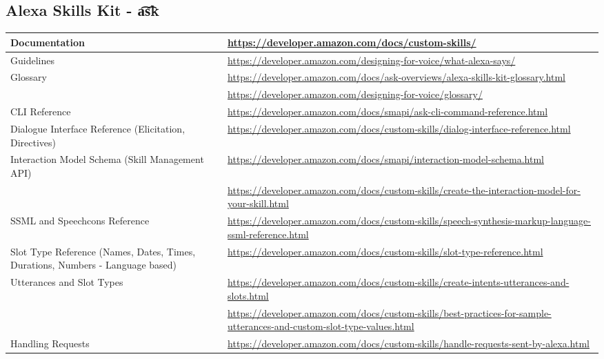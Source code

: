 \subsection*{Alexa Skills Kit - \t{a\t{sk}}}
\begin{flushleft}
	\begin{tabu}to\textwidth{X |  X[2]}

Documentation &
\url{https://developer.amazon.com/docs/custom-skills/} \\ \hline

Guidelines & \url{https://developer.amazon.com/designing-for-voice/what-alexa-says/}\\ \hline

Glossary & 
\url{https://developer.amazon.com/docs/ask-overviews/alexa-skills-kit-glossary.html}\\ & \url{https://developer.amazon.com/designing-for-voice/glossary/}\\ \hline



CLI Reference &
\url{https://developer.amazon.com/docs/smapi/ask-cli-command-reference.html}\\ \hline

Dialogue Interface Reference (Elicitation, Directives) &
\url{https://developer.amazon.com/docs/custom-skills/dialog-interface-reference.html}\\ \hline

Interaction Model Schema (Skill Management API) &
	\url{https://developer.amazon.com/docs/smapi/interaction-model-schema.html} \\ 
& \url{https://developer.amazon.com/docs/custom-skills/create-the-interaction-model-for-your-skill.html}\\ \hline

SSML and Speechcons Reference &
\url{https://developer.amazon.com/docs/custom-skills/speech-synthesis-markup-language-ssml-reference.html}\\ \hline


Slot Type Reference (Names, Dates, Times, Durations, Numbers - Language based)&
\url{https://developer.amazon.com/docs/custom-skills/slot-type-reference.html}\\\hline


Utterances and Slot Types & \url{https://developer.amazon.com/docs/custom-skills/create-intents-utterances-and-slots.html} \\  & \url{https://developer.amazon.com/docs/custom-skills/best-practices-for-sample-utterances-and-custom-slot-type-values.html}\\ \hline

Handling Requests & \url{https://developer.amazon.com/docs/custom-skills/handle-requests-sent-by-alexa.html} \\ \hline
%




\end{tabu}
\end{flushleft}

